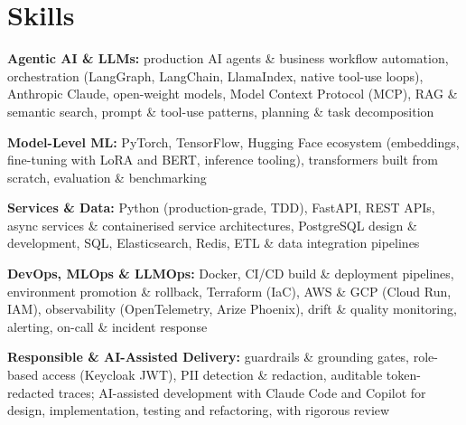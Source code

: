 \documentclass[10pt,a4paper]{article}
\begin{document}
\section{Skills}
\begin{tight}
  \item[\textcolor{accent}{\small$\bullet$}] \textbf{Agentic AI \& LLMs:} production AI agents \& business workflow automation, orchestration (LangGraph, LangChain, LlamaIndex, native tool-use loops), Anthropic Claude, open-weight models, Model Context Protocol (MCP), RAG \& semantic search, prompt \& tool-use patterns, planning \& task decomposition
  \item[\textcolor{accent}{\small$\bullet$}] \textbf{Model-Level ML:} PyTorch, TensorFlow, Hugging Face ecosystem (embeddings, fine-tuning with LoRA and BERT, inference tooling), transformers built from scratch, evaluation \& benchmarking
  \item[\textcolor{accent}{\small$\bullet$}] \textbf{Services \& Data:} Python (production-grade, TDD), FastAPI, REST APIs, async services \& containerised service architectures, PostgreSQL design \& development, SQL, Elasticsearch, Redis, ETL \& data integration pipelines
  \item[\textcolor{accent}{\small$\bullet$}] \textbf{DevOps, MLOps \& LLMOps:} Docker, CI/CD build \& deployment pipelines, environment promotion \& rollback, Terraform (IaC), AWS \& GCP (Cloud Run, IAM), observability (OpenTelemetry, Arize Phoenix), drift \& quality monitoring, alerting, on-call \& incident response
  \item[\textcolor{accent}{\small$\bullet$}] \textbf{Responsible \& AI-Assisted Delivery:} guardrails \& grounding gates, role-based access (Keycloak JWT), PII detection \& redaction, auditable token-redacted traces; AI-assisted development with Claude Code and Copilot for design, implementation, testing and refactoring, with rigorous review
\end{tight}

\end{document}
